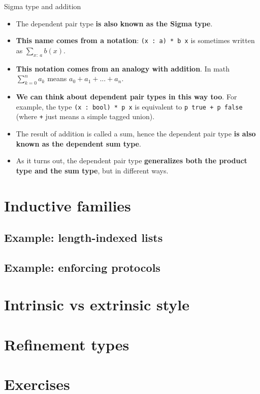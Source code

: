 \documentclass{beamer}
\newcommand{\m}[1]{\texttt{#1}}
\begin{document}
\begin{frame}{Sigma type and addition}
\begin{itemize}
	\item The dependent pair type \textbf{is also known as the Sigma type}.
	\item \textbf{This name comes from a notation}: \m{(x :\ a) * b x} is sometimes written as $\displaystyle \sum_{x :\ a} b(x)$.
	\item \textbf{This notation comes from an analogy with addition}. In math $\displaystyle \sum_{k = 0}^n a_k$ means $a_0 + a_1 + ... + a_n$.
	\item \textbf{We can think about dependent pair types in this way too}. For example, the type \m{(x :\ bool) * p x} is equivalent to \m{p true + p false} (where \m{+} just means a simple tagged union).
	\item The result of addition is called a sum, hence the dependent pair type \textbf{is also known as the dependent sum type}.
	\item As it turns out, the dependent pair type \textbf{generalizes both the product type and the sum type}, but in different ways.
\end{itemize}
\end{frame}

\section{Inductive families}

\subsection{Example: length-indexed lists}

\subsection{Example: enforcing protocols}

\section{Intrinsic vs extrinsic style}

\section{Refinement types}

\section{Exercises}
\end{document}
